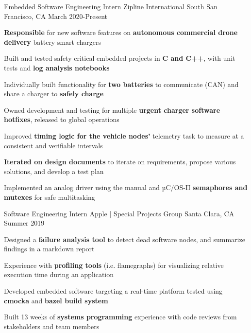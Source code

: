 

\begin{cventries}

  
  \cventry
    {Embedded Software Engineering Intern} %
    {Zipline International} %
    {South San Francisco, CA} %
    {March 2020-Present} %
    {
      \begin{cvitems} %
        \item {\textbf{Responsible} for new software features on \textbf{autonomous commercial drone delivery} battery smart chargers}
        \item {Built and tested safety critical embedded projects in \textbf{C and C++}, with unit tests and \textbf{log analysis notebooks}}
        \item {Individually built functionality for \textbf{two batteries} to communicate (CAN) and share a charger to \textbf{safely charge}}
        \item {Owned development and testing for multiple \textbf{urgent charger software hotfixes}, released to global operations  } 
        \item {Improved \textbf{timing logic for the vehicle nodes'} telemetry task to measure at a consistent and verifiable intervals}
        \item {\textbf{Iterated on design documents} to iterate on requirements, propose various solutions, and develop a test plan}
        \item {Implemented an analog driver using the manual and µC/OS-II \textbf{semaphores and mutexes} for safe multitasking}
      \end{cvitems}
    }

  \cventry
    {Software Engineering Intern} %
    {Apple | Special Projects Group} %
    {Santa Clara, CA} %
    {Summer 2019} %
    {
      \begin{cvitems} %
      \item {Designed a \textbf{failure analysis tool} to detect dead software nodes, and summarize findings in a markdown report}
      \item {Experience with \textbf{profiling tools} (i.e. flamegraphs) for visualizing relative execution time during an application} 
      \item {Developed embedded software targeting a real-time platform tested using \textbf{cmocka} and \textbf{bazel build system}} 
      \item {Built 13 weeks of \textbf{systems programming} experience with code reviews from stakeholders and team members}
      \end{cvitems}
    }


\end{cventries}
